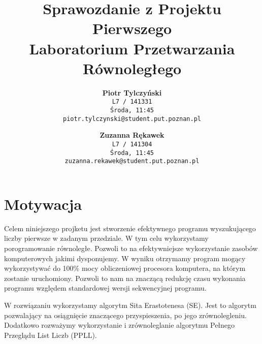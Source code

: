 \documentclass{article}
\begin{document}
    \title{
        Sprawozdanie z Projektu Pierwszego \\
        \small{Laboratorium Przetwarzania Równoległego}
    }
    \author{
        \textbf{Piotr Tylczyński}\\
        \texttt{L7 / 141331} \\
        \texttt{Środa, 11:45} \\
        \texttt{piotr.tylczynski@student.put.poznan.pl}
        \and
        \textbf{Zuzanna Rękawek}\\
        \texttt{L7 / 141304} \\
        \texttt{Środa, 11:45} \\
        \texttt{zuzanna.rekawek@student.put.poznan.pl}
        \date{}
        }
    \begin{titlepage}
        \maketitle
        \hfill \break
            
            
    \end{titlepage}
    
    \tableofcontents
    \pagebreak
    
    \section{Motywacja}
        Celem niniejszego projketu jest stworzenie efektywnego programu wyszukującego liczby pierwsze w zadanym przedziale. W tym celu wykorzystamy porogramowanie równoległe. Pozwoli to na efektywniejsze wykorzystanie zasobów komputerowych jakimi dysponujemy. W wyniku otrzymamy program mogący wykorzystywać do 100\% mocy obliczeniowej procesora komputera, na którym zostanie uruchomiony. Pozwoli to nam na znaczącą redukcję czasu wykonania programu względem standardowej wersji sekwencyjnej programu.
        
        W rozwiązaniu wykorzystamy algorytm Sita Erastotenesa (\gls{SE}). Jest to algorytm pozwalający na osiągnięcie znaczącego przyspieszenia, po jego zrównolegleniu. Dodatkowo rozważymy wykorzystanie i zrównoleglanie algorytmu Pełnego Przeglądu List Liczb (\gls{PPLL}).
                 
\end{document}
